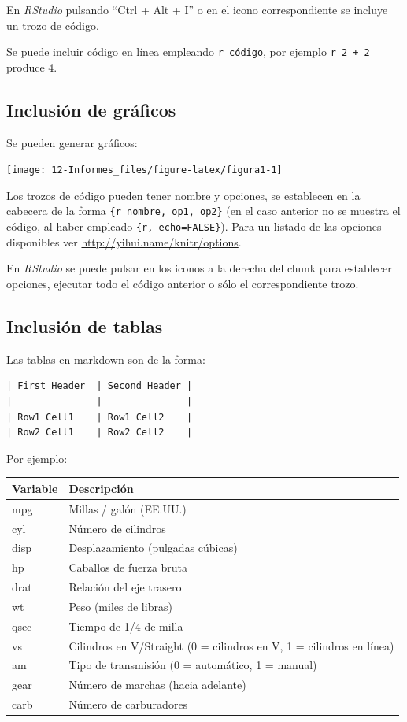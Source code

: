 \documentclass[]{book}
\begin{document}
En \emph{RStudio} pulsando ``Ctrl + Alt + I'' o en el icono
correspondiente se incluye un trozo de código.

Se puede incluir código en línea empleando
\texttt{\textasciigrave{}r\ código\textasciigrave{}}, por ejemplo
\texttt{\textasciigrave{}r\ 2\ +\ 2\textasciigrave{}} produce 4.

\subsection{Inclusión de gráficos}\label{inclusion-de-graficos}

Se pueden generar gráficos:

\begin{center}\texttt{[image: 12-Informes\_files/figure-latex/figura1-1]} \end{center}

Los trozos de código pueden tener nombre y opciones, se establecen en la
cabecera de la forma
\texttt{\textasciigrave{}\textasciigrave{}\textasciigrave{}\{r\ nombre,\ op1,\ op2\}}
(en el caso anterior no se muestra el código, al haber empleado
\texttt{\textasciigrave{}\textasciigrave{}\textasciigrave{}\{r,\ echo=FALSE\}}).
Para un listado de las opciones disponibles ver
\url{http://yihui.name/knitr/options}.

En \emph{RStudio} se puede pulsar en los iconos a la derecha del chunk
para establecer opciones, ejecutar todo el código anterior o sólo el
correspondiente trozo.

\subsection{Inclusión de tablas}\label{inclusion-de-tablas}

Las tablas en markdown son de la forma:

\begin{verbatim}
| First Header  | Second Header |
| ------------- | ------------- |
| Row1 Cell1    | Row1 Cell2    |
| Row2 Cell1    | Row2 Cell2    |
\end{verbatim}

Por ejemplo:

\begin{longtable}[]{@{}ll@{}}
\toprule
Variable & Descripción\tabularnewline
\midrule
\endhead
mpg & Millas / galón (EE.UU.)\tabularnewline
cyl & Número de cilindros\tabularnewline
disp & Desplazamiento (pulgadas cúbicas)\tabularnewline
hp & Caballos de fuerza bruta\tabularnewline
drat & Relación del eje trasero\tabularnewline
wt & Peso (miles de libras)\tabularnewline
qsec & Tiempo de 1/4 de milla\tabularnewline
vs & Cilindros en V/Straight (0 = cilindros en V, 1 = cilindros en
línea)\tabularnewline
am & Tipo de transmisión (0 = automático, 1 = manual)\tabularnewline
gear & Número de marchas (hacia adelante)\tabularnewline
carb & Número de carburadores\tabularnewline
\bottomrule
\end{longtable}
\end{document}
